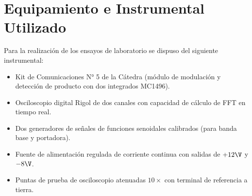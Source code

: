 \section{Equipamiento e Instrumental Utilizado}
Para la realización de los ensayos de laboratorio se dispuso del siguiente instrumental:
\begin{itemize}
    \item Kit de Comunicaciones N° 5 de la Cátedra (módulo de modulación y detección de producto con dos integrados MC1496).
    \item Osciloscopio digital Rigol de dos canales con capacidad de cálculo de FFT en tiempo real.
    \item Dos generadores de señales de funciones senoidales calibrados (para banda base y portadora).
    \item Fuente de alimentación regulada de corriente continua con salidas de $+12\V$ y $-8\V$.
    \item Puntas de prueba de osciloscopio atenuadas $10\times$ con terminal de referencia a tierra.
\end{itemize}

